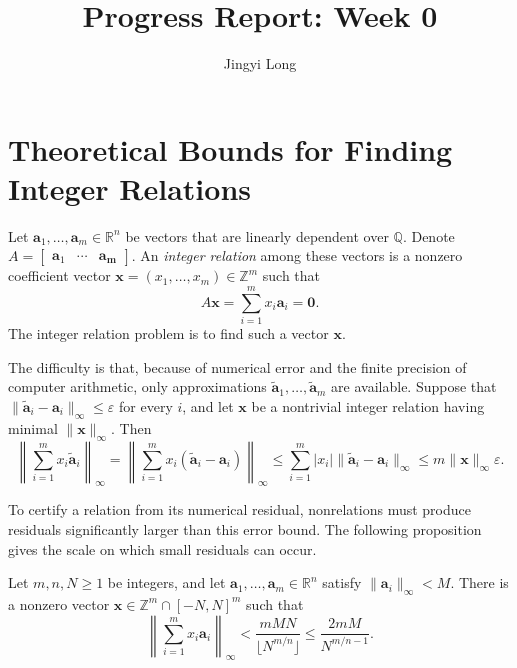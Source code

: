 \documentclass{weeklyprogress}
\title{Progress Report: Week 0}
\author{Jingyi Long}
\begin{document}
\section{Theoretical Bounds for Finding Integer Relations}

\begin{definition}
Let $\bm{a}_1,\ldots,\bm{a}_m\in\mathbb{R}^n$ be vectors that are linearly dependent over $\mathbb{Q}$. Denote $A = \begin{bmatrix}\bm{a}_1 &\cdots &\bm{a_m}\end{bmatrix}$. An \emph{integer relation} among these vectors is a nonzero coefficient vector $\bm{x}=(x_1,\ldots,x_m)\in\mathbb{Z}^m$ such that
\[ A \bm{x} = \sum_{i=1}^m x_i\bm{a}_i=\bm{0}. \]
The integer relation problem is to find such a vector $\bm{x}$.
\end{definition}

The difficulty is that, because of numerical error and the finite precision of computer arithmetic, only approximations $\widetilde{\bm{a}}_1,\ldots,\widetilde{\bm{a}}_m$ are available. Suppose that $\lVert\widetilde{\bm{a}}_i-\bm{a}_i\rVert_\infty\leq\varepsilon$ for every $i$, and let $\bm{x}$ be a nontrivial integer relation having minimal $\lVert\bm{x}\rVert_\infty$. Then
\[ \left\lVert\sum_{i=1}^m x_i\widetilde{\bm{a}}_i\right\rVert_\infty=\left\lVert\sum_{i=1}^m x_i(\widetilde{\bm{a}}_i-\bm{a}_i)\right\rVert_\infty\leq\sum_{i=1}^m|x_i|\lVert\widetilde{\bm{a}}_i-\bm{a}_i\rVert_\infty\leq m\lVert\bm{x}\rVert_\infty\varepsilon. \]

To certify a relation from its numerical residual, nonrelations must produce residuals significantly larger than this error bound. The following proposition gives the scale on which small residuals can occur.

\begin{proposition}
Let $m,n,N\geq1$ be integers, and let $\bm{a}_1,\ldots,\bm{a}_m\in\mathbb{R}^n$ satisfy $\lVert\bm{a}_i\rVert_\infty<M$. There is a nonzero vector $\bm{x}\in\mathbb{Z}^m\cap[-N,N]^m$ such that
\[ \left\lVert\sum_{i=1}^m x_i\bm{a}_i\right\rVert_\infty<\frac{mMN}{\lfloor N^{m/n}\rfloor}\leq\frac{2mM}{N^{m/n-1}}. \]
\end{proposition}
\end{document}
